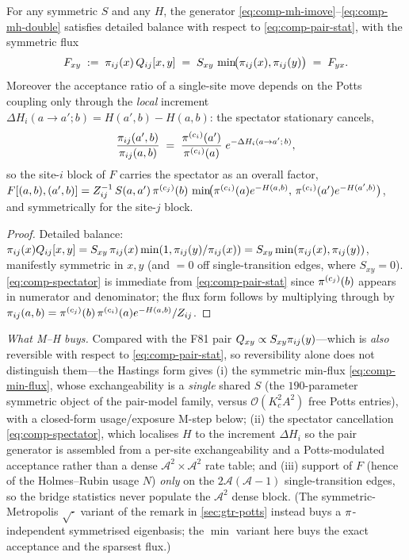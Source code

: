 \begin{proposition}
\label{prop:comp-mh}
For any symmetric $S$ and any $H$, the generator
\eqref{eq:comp-mh-imove}--\eqref{eq:comp-mh-double} satisfies detailed
balance with respect to \eqref{eq:comp-pair-stat}, with the symmetric flux
\begin{equation}
  F_{xy}\;:=\;\pi_{ij}(x)\,Q_{ij}[x,y]
    \;=\; S_{xy}\,\min\!\bigl(\pi_{ij}(x),\pi_{ij}(y)\bigr)
    \;=\;F_{yx}.
  \label{eq:comp-min-flux}
\end{equation}
Moreover the acceptance ratio of a single-site move depends on the
Potts coupling only through the \emph{local} increment
$\Delta H_i(a\!\to\!a';b)=H(a',b)-H(a,b)$: the spectator stationary
cancels,
\begin{equation}
  \frac{\pi_{ij}(a',b)}{\pi_{ij}(a,b)}
    \;=\;\frac{\pi^{(c_i)}(a')}{\pi^{(c_i)}(a)}\;
        e^{-\Delta H_i(a\to a';\,b)},
  \label{eq:comp-spectator}
\end{equation}
so the site-$i$ block of $F$ carries the spectator as an overall factor,
$F[(a,b),(a',b)]=Z_{ij}^{-1}\,S(a,a')\,\pi^{(c_j)}(b)\,
\min\!\bigl(\pi^{(c_i)}(a)e^{-H(a,b)},\,\pi^{(c_i)}(a')e^{-H(a',b)}\bigr)$,
and symmetrically for the site-$j$ block.
\end{proposition}

\begin{proof}
Detailed balance: $\pi_{ij}(x)Q_{ij}[x,y]
=S_{xy}\,\pi_{ij}(x)\min(1,\pi_{ij}(y)/\pi_{ij}(x))
=S_{xy}\min(\pi_{ij}(x),\pi_{ij}(y))$, manifestly symmetric in $x,y$
(and $=0$ off single-transition edges, where $S_{xy}=0$).
\eqref{eq:comp-spectator} is immediate from \eqref{eq:comp-pair-stat} since
$\pi^{(c_j)}(b)$ appears in numerator and denominator; the flux form
follows by multiplying through by $\pi_{ij}(a,b)=\pi^{(c_j)}(b)\,
\pi^{(c_i)}(a)e^{-H(a,b)}/Z_{ij}$.
\end{proof}

\emph{What M--H buys.} Compared with the F81 pair
$Q_{xy}\propto S_{xy}\pi_{ij}(y)$---which is \emph{also} reversible with
respect to \eqref{eq:comp-pair-stat}, so reversibility alone does not
distinguish them---the Hastings form gives (i) the symmetric min-flux
\eqref{eq:comp-min-flux}, whose exchangeability is a \emph{single} shared
$S$ (the $190$-parameter symmetric object of the pair-model family, versus
$\mathcal{O}(K_c^2A^2)$ free Potts entries), with a closed-form
usage/exposure M-step below; (ii) the spectator cancellation
\eqref{eq:comp-spectator}, which localises $H$ to the increment
$\Delta H_i$ so the pair generator is assembled from a per-site
exchangeability and a Potts-modulated acceptance rather than a dense
$\mathcal{A}^2\times\mathcal{A}^2$ rate table; and (iii) support of $F$ (hence
of the Holmes--Rubin usage $N$) \emph{only} on the $2\mathcal{A}(\mathcal{A}-1)$
single-transition edges, so the bridge statistics never populate the
$\mathcal{A}^2$ dense block. (The symmetric-Metropolis $\sqrt{\cdot}$ variant of
the remark in \autoref{sec:gtr-potts} instead buys a $\pi$-independent
symmetrised eigenbasis; the $\min$ variant here buys the exact acceptance
and the sparsest flux.)


